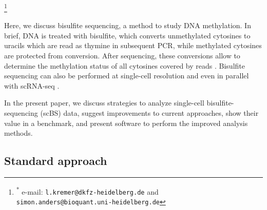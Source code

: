 \documentclass[twocolumn,10pt]{article}
\newcommand\blfootnote[1]{%
    \begingroup
    \renewcommand\thefootnote{}\footnote{#1}%
    \addtocounter{footnote}{-1}%
    \endgroup
}
\begin{document}
\blfootnote{\hspace{-.5cm}\raggedright\textsuperscript{*} e-mail:  \texttt{l.kremer@dkfz-heidelberg.de} and\\ \hspace{1cm}\texttt{simon.anders@bioquant.uni-heidelberg.de}}

Here, we discuss bisulfite sequencing, a method to study DNA methylation.
In brief, DNA is treated with bisulfite, which converts unmethylated cytosines to uracils which are read as thymine in subsequent PCR, while methylated cytosines are protected from conversion.
After sequencing, these conversions allow to determine the methylation status of all cytosines covered by reads \citep{Frommer_1992}.
Bisulfite sequencing can also be performed at single-cell resolution \citep{Smallwood_2014} and even in parallel with scRNA-seq \citep{scMTseq,Clark2018}.

In the present paper, we discuss strategies to analyze single-cell bisulfite-sequencing (scBS) data, suggest improvements to current approaches, show their value in a benchmark, and present software to perform the improved analysis methods.

\subsection{Standard approach}
\end{document}
